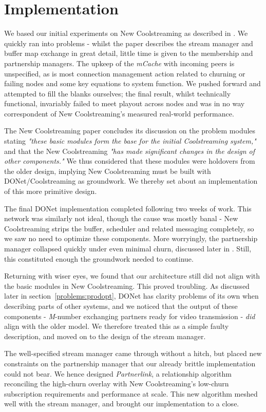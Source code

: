 \documentclass[12pt,a4paper]{article}
\begin{document}
\section{Implementation} \label{implementation}
We based our initial experiments on New Coolstreaming as described in \cite{Li2008}. We quickly ran into problems - whilst the paper describes the stream manager and buffer map exchange in great detail, little time is given to the membership and partnership managers. The upkeep of the \textit{mCache} with incoming peers is unspecified, as is most connection management action related to churning or failing nodes and some key equations to system function. We pushed forward and attempted to fill the blanks ourselves; the final result, whilst technically functional, invariably failed to meet playout across nodes and was in no way correspondent of New Coolstreaming's measured real-world performance.

The New Coolstreaming paper concludes its discussion on the problem modules stating \textit{"these basic modules form the base for the initial Coolstreaming system,"} and that the New Coolstreaming \textit{"has made significant changes in the design of other components."} We thus considered that these modules were holdovers from the older design, implying New Coolstreaming must be built with  DONet/Coolstreaming as groundwork. We thereby set about an implementation of this more primitive design.

The final DONet implementation completed following two weeks of work. This network was similarly not ideal, though the cause was mostly banal - New Coolstreaming strips the buffer, scheduler and related messaging completely, so we saw no need to optimize these components. More worryingly, the partnership manager collapsed quickly under even minimal churn, discussed later in . Still, this constituted enough the groundwork needed to continue.

Returning with wiser eyes, we found that our architecture still did not align with the basic modules in New Coolstreaming. This proved troubling. As discussed later in section~\ref{problems:prodopt}, DONet has clarity problems of its own when describing parts of other systems, and we noticed that the output of these components - \textit{M}-number exchanging partners ready for video transmission - \textit{did} align with the older model. We therefore treated this as a simple faulty description, and moved on to the design of the stream manager.

The well-specified stream manager came through without a hitch, but placed new constraints on the partnership manager that our already brittle implementation could not bear. We hence designed \textit{Partnerlink}, a relationship algorithm reconciling the high-churn overlay with New Coolstreaming's low-churn subscription requirements and performance at scale. This new algorithm meshed well with the stream manager, and brought our implementation to a close.
\end{document}
